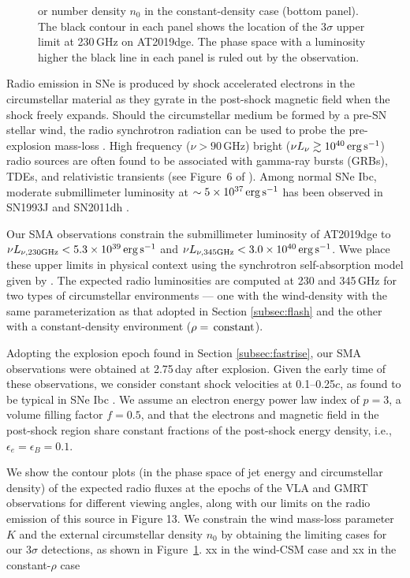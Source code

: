 \documentclass[twocolumn]{aastex63}
\begin{document}
\begin{CJK*}{UTF8}{gbsn}
\begin{figure}
{	or number density $n_0$ in the constant-density case (bottom panel). The black contour in each 
	panel shows the location of the 3$\sigma$ upper limit at 230\,GHz on AT2019dge. The phase space 
	with a luminosity higher the black line in each panel is ruled out by the observation.
		\label{fig:radio}}
\end{figure}
Radio emission in SNe is produced by shock accelerated electrons in the circumstellar material as they 
gyrate in the post-shock magnetic field when the shock freely expands. Should the circumstellar 
medium be formed by a pre-SN stellar wind, the radio synchrotron radiation can be used to probe the 
pre-explosion mass-loss \citep{Chevalier1982}. High frequency ($\nu>90$\,GHz) bright 
($\nu L_\nu \gtrsim 10^{40} \, \rm erg\, 
s^{-1}$) radio sources are often found to be associated with gamma-ray bursts (GRBs), TDEs, and 
relativistic transients (see Figure~6 of \citealt{HoPhinney2019}). Among normal SNe Ibc, moderate 
submillimeter luminosity at $\sim 5\times 10^{37}\, \rm erg\, s^{-1}$ has been observed in SN1993J 
\citep{Weiler2007} and SN2011dh \citep{Horesh2013}.

Our SMA observations constrain the submillimeter luminosity of AT2019dge to $\nu L_{\nu \rm , 
230GHz} < 5.3\times 10^{39}\, \rm erg\, s^{-1}$ and $\nu L_{\nu \rm , 345GHz} < 3.0\times 10^{40}\, \rm 
erg\, s^{-1}$. Wwe place these upper limits in physical context using the synchrotron self-absorption 
model given by \citet{Chevalier1998}. The expected radio luminosities are computed at 230 and 
345\,GHz for two types of circumstellar environments --- one with the wind-density with the same 
parameterization as that adopted in Section \ref{subsec:flash} and the other with a constant-density 
environment ($\rho = \,{\rm constant}$). 

Adopting the explosion epoch found in Section \ref{subsec:fastrise}, our SMA observations were 
obtained at 2.75\,day after explosion. Given the early time of these observations, we consider constant 
shock velocities at 0.1--0.25$c$, as found to be typical in SNe Ibc \citep{Wellons2012}. We assume an 
electron energy power law index of $p = 3$, a volume filling factor $f=0.5$, and that the electrons 
and magnetic field in the post-shock region share constant fractions of the post-shock energy 
density, i.e., $\epsilon_e = \epsilon_B = 0.1$.

We show the contour plots (in the phase space of jet energy and circumstellar density) of the expected 
radio fluxes at the epochs of the VLA and GMRT observations for different viewing angles, along with 
our limits on the radio emission of this source in Figure 13. 
We constrain the wind mass-loss parameter $K$ and the external circumstellar density $n_0$ by 
obtaining the limiting cases for our 3$\sigma$ detections, as shown in Figure~\ref{fig:radio}.
xx in the wind-CSM case and xx in the constant-$\rho$ case


\end{CJK*}
\end{document}
